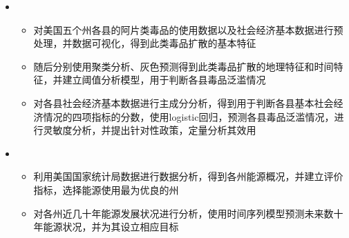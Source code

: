   \begin{itemize}[leftmargin=*]
    \item
      {\small
      \begin{itemize}
        \item 对美国五个州各县的阿片类毒品的使用数据以及社会经济基本数据进行预处理，并数据可视化，得到此类毒品扩散的基本特征
        \item 随后分别使用聚类分析、灰色预测得到此类毒品扩散的地理特征和时间特征，并建立阈值分析模型，用于判断各县毒品泛滥情况
        \item 对各县社会经济基本数据进行主成分分析，得到用于判断各县基本社会经济情况的四项指标的分数，使用logistic回归，预测各县毒品泛滥情况，进行灵敏度分析，并提出针对性政策，定量分析其效用    
      \end{itemize}
      }
          \item
      {\small
      \begin{itemize}
        \item 利用美国国家统计局数据进行数据分析，得到各州能源概况，并建立评价指标，选择能源使用最为优良的州
        \item 对各州近几十年能源发展状况进行分析，使用时间序列模型预测未来数十年能源状况，并为其设立相应目标  
      \end{itemize}
      }
  \end{itemize}